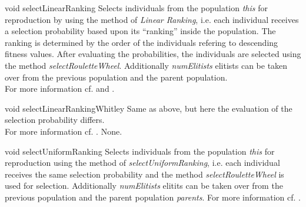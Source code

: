 \setNormalInstance
\setCorrectWidthThree{8pt}
\printMethodWithParamsSaved
{void}
{}
{selectLinearRanking}
{Selects individuals from the population {\em this} for reproduction by 
 using the method of {\em Linear Ranking}, i.e. each individual
 receives a selection probability based upon its ``ranking''
 inside the population. The ranking is determined by the order of
 the individuals refering to descending fitness values.
 After evaluating the probabilities, the individuals are selected
 using the method {\em selectRouletteWheel}.
 Additionally {\em numElitists} elitists
 can be taken over from the previous population and the parent
 population.\\
 For more information cf. \cite{Baker} and \cite{AlgoWork}.}
{}
\setCorrectWidthThree{4pt}

\clearpage

\setNormalInstance
\setCorrectWidthThree{8pt}
\printMethodWithParamsSaved
{void}
{}
{selectLinearRankingWhitley}
{Same as above, but here the evaluation of the selection
 probability differs.\\
 For more information cf. \cite{Whitley}.}
{None.}
\setCorrectWidthThree{4pt}

\vspace*{4ex}

\setNormalInstance
\setCorrectWidthThree{8pt}
\printMethodWithParamsSaved
{void}
{}
{selectUniformRanking}
{Selects individuals from the population {\em this} for reproduction
 using the method of {\em selectUniformRanking}, i.e.
 each individual receives the same selection probability and the method
 {\em selectRouletteWheel} is used for selection.
 Additionally {\em numElitists} elitits can be taken over from the
 previous population and the parent population {\em parents}.
 For more information cf. \cite{EALibRef}.}
{}
\setCorrectWidthThree{4pt}

